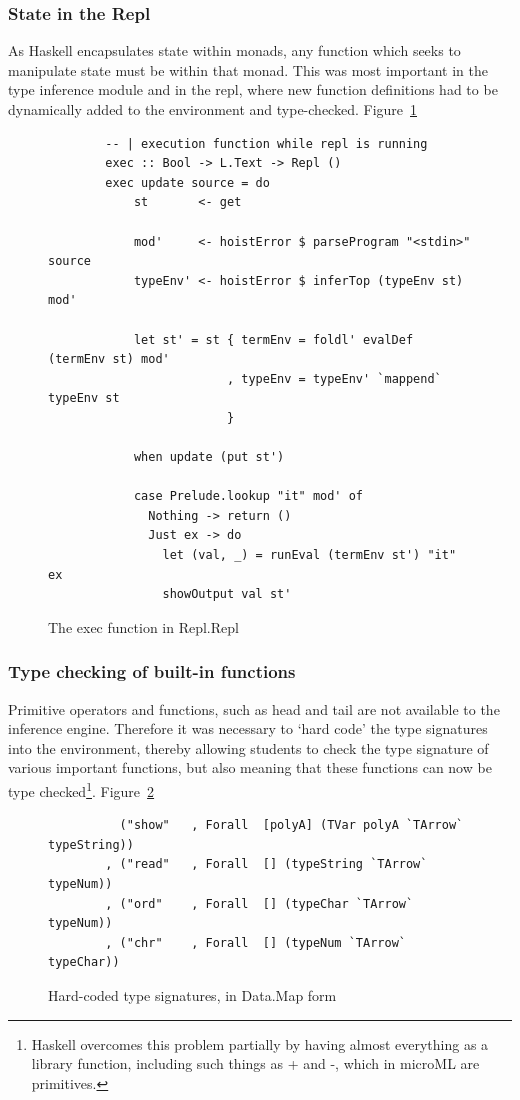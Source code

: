 \subsubsection{State in the Repl}
As Haskell encapsulates state within monads, any function which seeks to manipulate state must be
within that monad. This was most important in the type inference module and in the repl, where new
function definitions had to be dynamically added to the environment and type-checked.
Figure~\ref{fig:exec}

\begin{figure}
    \begin{verbatim}
        -- | execution function while repl is running
        exec :: Bool -> L.Text -> Repl ()
        exec update source = do
            st       <- get

            mod'     <- hoistError $ parseProgram "<stdin>" source
            typeEnv' <- hoistError $ inferTop (typeEnv st) mod'

            let st' = st { termEnv = foldl' evalDef (termEnv st) mod'
                         , typeEnv = typeEnv' `mappend` typeEnv st 
                         }

            when update (put st')

            case Prelude.lookup "it" mod' of
              Nothing -> return ()
              Just ex -> do
                let (val, _) = runEval (termEnv st') "it" ex
                showOutput val st'
    \end{verbatim}
    \caption{The exec function in Repl.Repl}
\label{fig:exec}
\end{figure}


\subsubsection{Type checking of built-in functions}
Primitive operators and functions, such as head and tail are not available to the inference engine.
Therefore it was necessary to `hard code' the type signatures into the environment, thereby allowing
students to check the type signature of various important functions, but also meaning that these
functions can now be type checked\footnote{Haskell overcomes this problem partially by having almost
everything as a library function, including such things as + and -, which in microML are
primitives.}. Figure~\ref{fig:typesigs}

\begin{figure}
    \begin{verbatim}
          ("show"   , Forall  [polyA] (TVar polyA `TArrow` typeString))
        , ("read"   , Forall  [] (typeString `TArrow` typeNum))
        , ("ord"    , Forall  [] (typeChar `TArrow` typeNum))
        , ("chr"    , Forall  [] (typeNum `TArrow` typeChar))
    \end{verbatim}
    \caption{Hard-coded type signatures, in Data.Map form}
\label{fig:typesigs}
\end{figure}

